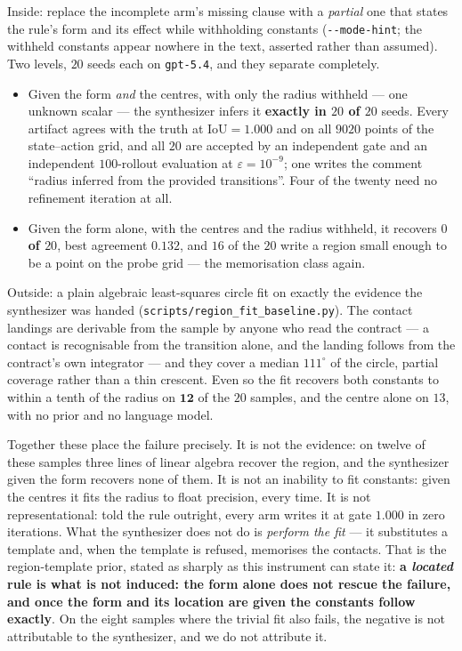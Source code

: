 \documentclass[11pt]{article}
\theoremstyle{definition}
\theoremstyle{remark}
\begin{document}
Inside: replace the incomplete arm's missing clause with a \emph{partial} one that states the rule's form and its effect while withholding constants (\texttt{-{}-mode-hint}; the withheld constants appear nowhere in the text, asserted rather than assumed). Two levels, $20$ seeds each on \texttt{gpt-5.4}, and they separate completely.
\begin{itemize}
\item Given the form \emph{and} the centres, with only the radius withheld --- one unknown scalar --- the synthesizer infers it \textbf{exactly in $20$ of $20$} seeds. Every artifact agrees with the truth at $\mathrm{IoU} = 1.000$ and on all $9020$ points of the state--action grid, and all $20$ are accepted by an independent gate and an independent $100$-rollout evaluation at $\varepsilon = 10^{-9}$; one writes the comment ``radius inferred from the provided transitions''. Four of the twenty need no refinement iteration at all.
\item Given the form alone, with the centres and the radius withheld, it recovers \textbf{$0$ of $20$}, best agreement $0.132$, and $16$ of the $20$ write a region small enough to be a point on the probe grid --- the memorisation class again.
\end{itemize}

Outside: a plain algebraic least-squares circle fit on exactly the evidence the synthesizer was handed (\texttt{scripts/\allowbreak region\_\allowbreak fit\_\allowbreak baseline.py}). The contact landings are derivable from the sample by anyone who read the contract --- a contact is recognisable from the transition alone, and the landing follows from the contract's own integrator --- and they cover a median $111^\circ$ of the circle, partial coverage rather than a thin crescent. Even so the fit recovers both constants to within a tenth of the radius on $\mathbf{12}$ of the $20$ samples, and the centre alone on $13$, with no prior and no language model.

Together these place the failure precisely. It is not the evidence: on twelve of these samples three lines of linear algebra recover the region, and the synthesizer given the form recovers none of them. It is not an inability to fit constants: given the centres it fits the radius to float precision, every time. It is not representational: told the rule outright, every arm writes it at gate $1.000$ in zero iterations. What the synthesizer does not do is \emph{perform the fit} --- it substitutes a template and, when the template is refused, memorises the contacts. That is the region-template prior, stated as sharply as this instrument can state it: \textbf{a \emph{located} rule is what is not induced: the form alone does not rescue the failure, and once the form and its location are given the constants follow exactly}. On the eight samples where the trivial fit also fails, the negative is not attributable to the synthesizer, and we do not attribute it.
\end{document}
